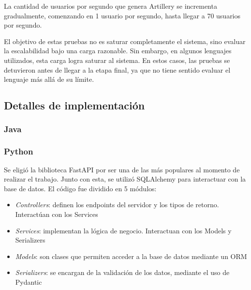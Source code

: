 \documentclass[11pt]{article}
\let\Oldsubsection\subsection
\renewcommand{\subsection}{\FloatBarrier\Oldsubsection}
\let\Oldsubsubsection\subsubsection
\renewcommand{\subsubsection}{\FloatBarrier\Oldsubsubsection}
\begin{document}
La cantidad de usuarios por segundo que genera Artillery se incrementa gradualmente, comenzando en 1 usuario por segundo, hasta llegar a 70 usuarios por segundo.

El objetivo de estas pruebas no es saturar completamente el sistema, sino evaluar la escalabilidad bajo una carga razonable. Sin embargo, en algunos lenguajes utilizados, esta carga logra saturar al sistema. En estos casos, las pruebas se detuvieron antes de llegar a la etapa final, ya que no tiene sentido evaluar el lenguaje más allá de su límite.


\subsection{Detalles de implementación}


\subsubsection{Java}


\subsubsection{Python}

Se eligió la biblioteca FastAPI por ser una de las más populares al momento de realizar el trabajo. Junto con esta, se utilizó SQLAlchemy para interactuar con la base de datos. El código fue dividido en 5 módulos:

\begin{itemize}
    \item \textit{Controllers}: definen los endpoints del servidor y los tipos de retorno. Interactúan con los Services
    \item \textit{Services}: implementan la lógica de negocio. Interactuan con los Models y Serializers
    \item \textit{Models}: son clases que permiten acceder a la base de datos mediante un ORM
    \item \textit{Serializers}: se encargan de la validación de los datos, mediante el uso de Pydantic
\end{itemize}
\end{document}
